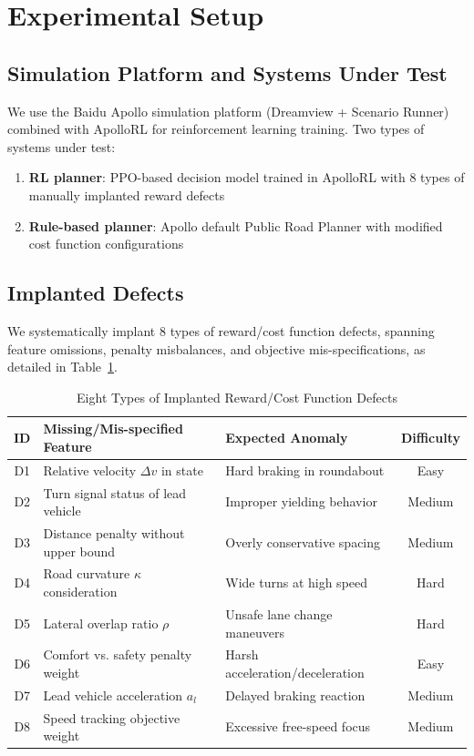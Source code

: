 \documentclass[conference]{IEEEtran}
\theoremstyle{plain}
\begin{document}
\section{Experimental Setup}
\label{sec:experimental}

\subsection{Simulation Platform and Systems Under Test}
We use the Baidu Apollo simulation platform (Dreamview + Scenario Runner) combined with ApolloRL for reinforcement learning training. Two types of systems under test:
\begin{enumerate}
    \item \textbf{RL planner}: PPO-based decision model trained in ApolloRL with 8 types of manually implanted reward defects
    \item \textbf{Rule-based planner}: Apollo default Public Road Planner with modified cost function configurations
\end{enumerate}

\subsection{Implanted Defects}
We systematically implant 8 types of reward/cost function defects, spanning feature omissions, penalty misbalances, and objective mis-specifications, as detailed in Table~\ref{tab:defects}.

\begin{table}[h]
\centering
\caption{Eight Types of Implanted Reward/Cost Function Defects}
\label{tab:defects}
\begin{tabular}{cp{3.8cm}p{3.2cm}c}
\toprule
\textbf{ID} & \textbf{Missing/Mis-specified Feature} & \textbf{Expected Anomaly} & \textbf{Difficulty} \\
\midrule
D1 & Relative velocity $\Delta v$ in state & Hard braking in roundabout & Easy \\
D2 & Turn signal status of lead vehicle & Improper yielding behavior & Medium \\
D3 & Distance penalty without upper bound & Overly conservative spacing & Medium \\
D4 & Road curvature $\kappa$ consideration & Wide turns at high speed & Hard \\
D5 & Lateral overlap ratio $\rho$ & Unsafe lane change maneuvers & Hard \\
D6 & Comfort vs. safety penalty weight & Harsh acceleration/deceleration & Easy \\
D7 & Lead vehicle acceleration $a_l$ & Delayed braking reaction & Medium \\
D8 & Speed tracking objective weight & Excessive free-speed focus & Medium \\
\bottomrule
\end{tabular}
\end{table}
\end{document}

